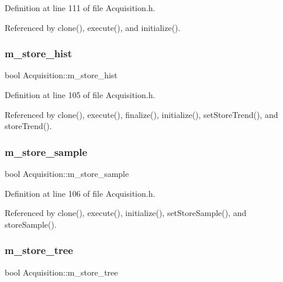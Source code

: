 Definition at line 111 of file Acquisition.\+h.



Referenced by clone(), execute(), and initialize().

\mbox{\label{classAcquisition_a08f70edd83751dbdab4c8190dc4b9188}} 
\subsubsection{\texorpdfstring{m\+\_\+store\+\_\+hist}{m\_store\_hist}}
{\footnotesize\ttfamily bool Acquisition\+::m\+\_\+store\+\_\+hist\hspace{0.3cm}{\ttfamily [private]}}



Definition at line 105 of file Acquisition.\+h.



Referenced by clone(), execute(), finalize(), initialize(), set\+Store\+Trend(), and store\+Trend().

\mbox{\label{classAcquisition_a987cc1d04007cf1f5acc1accfd0909e5}} 
\subsubsection{\texorpdfstring{m\+\_\+store\+\_\+sample}{m\_store\_sample}}
{\footnotesize\ttfamily bool Acquisition\+::m\+\_\+store\+\_\+sample\hspace{0.3cm}{\ttfamily [private]}}



Definition at line 106 of file Acquisition.\+h.



Referenced by clone(), execute(), initialize(), set\+Store\+Sample(), and store\+Sample().

\mbox{\label{classAcquisition_aca2143e9135e25554e58327475a767c5}} 
\subsubsection{\texorpdfstring{m\+\_\+store\+\_\+tree}{m\_store\_tree}}
{\footnotesize\ttfamily bool Acquisition\+::m\+\_\+store\+\_\+tree\hspace{0.3cm}{\ttfamily [private]}}



